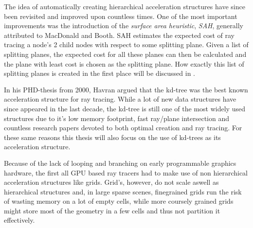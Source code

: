 
The idea of automatically creating hierarchical acceleration
structures have since been revisited and improved upon countless
times. One of the most important improvements was the introduction of
the \textit{surface area heuristic}, \textit{SAH}, generally
attributed to MacDonald and Booth. SAH
estimates the expected cost of ray tracing a node's 2 child nodes with
respect to some splitting plane. Given a list of splitting planes, the
expected cost for all these planes can then be calculated and the
plane with least cost is chosen as the splitting plane. How exactly
this list of splitting planes is created in the first place will be
discussed in .



In his PHD-thesis from 2000, Havran argued that
the kd-tree was the best known acceleration structure for ray
tracing. While a lot of new data structures have since appeared in the
last decade, the kd-tree is still one of the most widely used
structures due to it's low memory footprint, fast ray/plane
intersection and countless research papers devoted to both optimal
creation and ray tracing. For these same reasons this thesis will also
focus on the use of kd-trees as its acceleration structure.




Because of the lack of looping and branching on early programmable
graphics hardware, the first all GPU based ray tracers had to make use
of non hierarchical acceleration structures like
grids. Grid's, however, do not scale aswell as
hierarchical structures and, in large sparse scenes, finegrained grids
run the risk of wasting memory on a lot of empty cells, while more
coursely grained grids might store most of the geometry in a few cells
and thus not partition it effectively.


